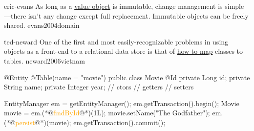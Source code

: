 \documentclass{article}
\begin{document}
\lnQuote
  {eric-evans}
  {As long as a \ul{value object} is immutable, change management is simple---there isn't any change except full replacement. Immutable objects can be freely shared.}
  {evans2004domain}



\lnQuote
  {ted-neward}
  {One of the first and most easily-recognizable problems in using objects as a front-end to a relational data store is that of \ul{how to map} classes to tables.}
  {neward2006vietnam}

\begin{pptWide}{2}
{\small\begin{ffcode}
@Entity
@Table(name = "movie")
public class Movie {
  @Id
  private Long id;
  private String name;
  private Integer year;
  // ctors
  // getters
  // setters
}
\end{ffcode}
}
\par\columnbreak\par
{\small\begin{ffcode}
EntityManager em = getEntityManager();
em.getTransaction().begin();
Movie movie = em.(*@\textcolor{orange}{findById}@*)(1L);
movie.setName("The Godfather");
em.(*@\textcolor{orange}{persist}@*)(movie);
em.getTransaction().commit();
\end{ffcode}
}
\end{pptWide}
\par
\plush{}
\end{document}

